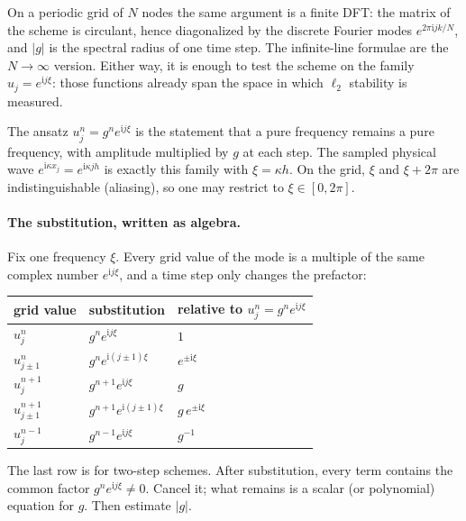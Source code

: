 \documentclass[11pt,a4paper]{article}
\begin{document}
On a periodic grid of \(N\) nodes the same argument is a finite DFT: the matrix of the scheme is circulant, hence diagonalized by the discrete Fourier modes \(e^{2\pi\mathrm i jk/N}\), and \(\lvert g\rvert\) is the spectral radius of one time step. The infinite-line formulae are the \(N\to\infty\) version. Either way, it is enough to test the scheme on the family \(u_j=e^{\mathrm i j\xi}\): those functions already span the space in which \(\ell_2\) stability is measured.

The ansatz \(u_j^n=g^n e^{\mathrm i j\xi}\) is the statement that a pure frequency remains a pure frequency, with amplitude multiplied by \(g\) at each step. The sampled physical wave \(e^{\mathrm i\kappa x_j}=e^{\mathrm i\kappa jh}\) is exactly this family with \(\xi=\kappa h\). On the grid, \(\xi\) and \(\xi+2\pi\) are indistinguishable (aliasing), so one may restrict to \(\xi\in[0,2\pi]\).

\paragraph{The substitution, written as algebra.}

Fix one frequency \(\xi\). Every grid value of the mode is a multiple of the same complex number \(e^{\mathrm i j\xi}\), and a time step only changes the prefactor:

\begin{center}
{\small
\begin{tabular}{@{}lll@{}}
\toprule
grid value & substitution & relative to \(u_j^n=g^n e^{\mathrm i j\xi}\) \\
\midrule
\(u_j^n\) & \(g^n e^{\mathrm i j\xi}\) & \(1\) \\
\(u_{j\pm 1}^n\) & \(g^n e^{\mathrm i(j\pm 1)\xi}\) & \(e^{\pm\mathrm i\xi}\) \\
\(u_j^{n+1}\) & \(g^{n+1}e^{\mathrm i j\xi}\) & \(g\) \\
\(u_{j\pm 1}^{n+1}\) & \(g^{n+1}e^{\mathrm i(j\pm 1)\xi}\) & \(g\,e^{\pm\mathrm i\xi}\) \\
\(u_j^{n-1}\) & \(g^{n-1}e^{\mathrm i j\xi}\) & \(g^{-1}\) \\
\bottomrule
\end{tabular}
}
\end{center}

The last row is for two-step schemes. After substitution, every term contains the common factor \(g^n e^{\mathrm i j\xi}\neq 0\). Cancel it; what remains is a scalar (or polynomial) equation for \(g\). Then estimate \(\lvert g\rvert\).
\end{document}
